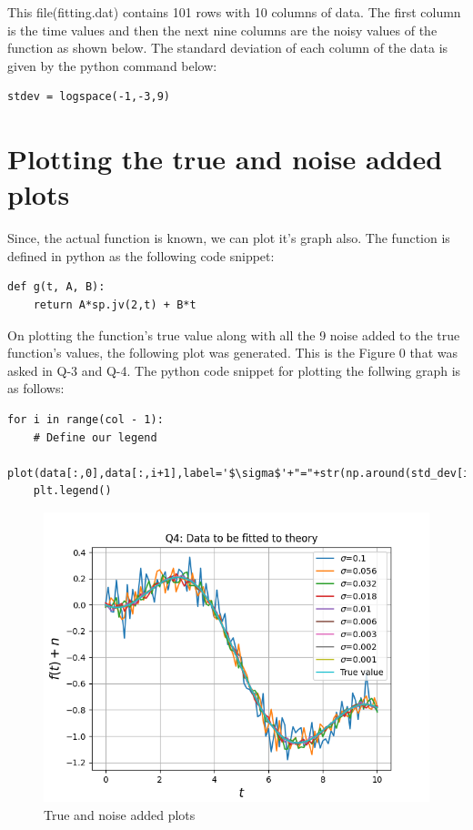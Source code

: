 \documentclass[11pt, a4paper]{article}
\begin{document}
   This file(fitting.dat) contains 101 rows with 10 columns of data. The first column is the time values and then the next nine columns are the noisy values of the function as shown below. The standard deviation of each column of the data is given by the python command below:
\begin{verbatim}	
stdev = logspace(-1,-3,9)
\end{verbatim}
\section{Plotting the true and noise added plots}
Since, the actual function is known, we can plot it's graph also. The function is defined in python \textit{} as the following code snippet:
\begin{verbatim}	
def g(t, A, B):
    return A*sp.jv(2,t) + B*t
\end{verbatim}

On plotting the function's true value along with all the 9 noise added to the true function's values, the following plot was generated. This is the Figure 0 that was asked in Q-3 and Q-4. The python code snippet for plotting the follwing graph is as follows:

\begin{verbatim}	
for i in range(col - 1):
    # Define our legend
    plot(data[:,0],data[:,i+1],label='$\sigma$'+"="+str(np.around(std_dev[i],3))) 
    plt.legend()
\end{verbatim}

	\begin{figure}[!tbh]
   	\centering
   	\includegraphics[scale=0.6]{Figure_Q4.png}   
   	\caption{True and noise added plots}
   	\label{fig:sample}
   \end{figure} 
   
\end{document}
